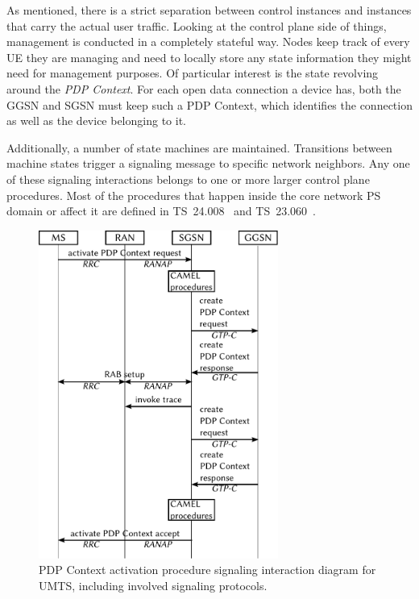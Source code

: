 As mentioned, there is a strict separation between control instances and instances that carry the actual user traffic. Looking at the control plane side of things, management is conducted in a completely stateful way. Nodes keep track of every \gls{UE} they are managing and need to locally store any state information they might need for management purposes. Of particular interest is the state revolving around the \textit{\gls{PDP} Context}. For each open data connection a device has, both the \gls{GGSN} and \gls{SGSN} must keep such a \gls{PDP} Context, which identifies the connection as well as the device belonging to it.

Additionally, a number of state machines are maintained. Transitions between machine states trigger a signaling message to specific network neighbors. Any one of these signaling interactions belongs to one or more larger control plane procedures. Most of the procedures that happen inside the core network \gls{PS} domain or affect it are defined in \gls{TS}~24.008~\cite{3gpp.24.008} and \gls{TS}~23.060~\cite{3gpp.23.060}.

\begin{figure}[htbp]
	\centering
	\includegraphics[width=0.7\textwidth]{images/pdp-context-activation-procedure.pdf}
	\caption{\acrshort{PDP} Context activation procedure signaling interaction diagram for \acrshort{UMTS}, including involved signaling protocols.}
\label{c4:fig:pdpcontextactivationinteraction}
\end{figure}

